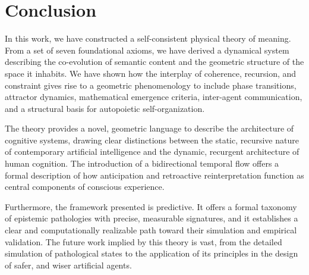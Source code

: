 \section{Conclusion}
\label{17.6:conclusion}

In this work, we have constructed a self-consistent physical theory of meaning. From a set of seven foundational axioms, we have derived a dynamical system describing the co-evolution of semantic content and the geometric structure of the space it inhabits. We have shown how the interplay of coherence, recursion, and constraint gives rise to a geometric phenomenology to include phase transitions, attractor dynamics, mathematical emergence criteria, inter-agent communication, and a structural basis for autopoietic self-organization.

The theory provides a novel, geometric language to describe the architecture of cognitive systems, drawing clear distinctions between the static, recursive nature of contemporary artificial intelligence and the dynamic, recurgent architecture of human cognition. The introduction of a bidirectional temporal flow offers a formal description of how anticipation and retroactive reinterpretation function as central components of conscious experience.

Furthermore, the framework presented is predictive. It offers a formal taxonomy of epistemic pathologies with precise, measurable signatures, and it establishes a clear and computationally realizable path toward their simulation and empirical validation. The future work implied by this theory is vast, from the detailed simulation of pathological states to the application of its principles in the design of safer, and wiser artificial agents.